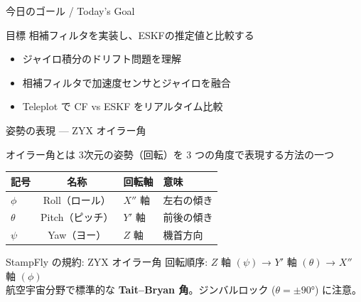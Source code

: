 \begin{frame}{今日のゴール / Today's Goal}
  \begin{block}{目標}
    相補フィルタを実装し、ESKFの推定値と比較する
  \end{block}

  \vspace{1em}

  \begin{itemize}
    \item ジャイロ積分のドリフト問題を理解
    \item 相補フィルタで加速度センサとジャイロを融合
    \item Teleplot で CF vs ESKF をリアルタイム比較
  \end{itemize}
\end{frame}

\begin{frame}{姿勢の表現 --- ZYX オイラー角}

  \begin{block}{オイラー角とは}
    3次元の姿勢（回転）を 3 つの角度で表現する方法の一つ
  \end{block}

  \vspace{0.3em}

  {\small
  \begin{tabular}{lcll}
    \hline
    \textbf{記号} & \textbf{名称} & \textbf{回転軸} & \textbf{意味} \\
    \hline
    $\phi$   & Roll（ロール）  & $X''$ 軸 & 左右の傾き \\
    $\theta$ & Pitch（ピッチ） & $Y'$ 軸  & 前後の傾き \\
    $\psi$   & Yaw（ヨー）     & $Z$ 軸   & 機首方向 \\
    \hline
  \end{tabular}
  }

  \vspace{0.5em}

  \begin{alertblock}{StampFly の規約: ZYX オイラー角}
    {\small
    回転順序: $Z$ 軸 $(\psi)$ → $Y'$ 軸 $(\theta)$ → $X''$ 軸 $(\phi)$\\[2pt]
    航空宇宙分野で標準的な \textbf{Tait--Bryan 角}。ジンバルロック ($\theta = \pm 90°$) に注意。
    }
  \end{alertblock}
\end{frame}


